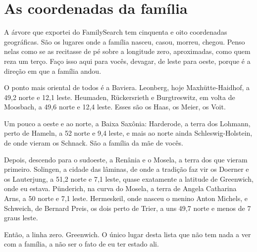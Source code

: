 \documentclass[
  brazilian,
  11pt,
  openany]{book}
\begin{document}
\section{As coordenadas da família}\label{as-coordenadas-da-famuxedlia}

A árvore que exportei do FamilySearch tem cinquenta e oito coordenadas
geográficas. São os lugares onde a família nasceu, casou, morreu,
chegou. Penso nelas como se as recitasse de pé sobre a longitude zero,
aproximadas, como quem reza um terço. Faço isso aqui para vocês,
devagar, de leste para oeste, porque é a direção em que a família andou.

O ponto mais oriental de todos é a Baviera. Leonberg, hoje
Maxhütte-Haidhof, a 49,2 norte e 12,1 leste. Heumaden, Rückersrieth e
Burgtreswitz, em volta de Moosbach, a 49,6 norte e 12,4 leste. Esses são
os Haas, os Meier, os Voit.

Um pouco a oeste e ao norte, a Baixa Saxônia: Harderode, a terra dos
Lohmann, perto de Hameln, a 52 norte e 9,4 leste, e mais ao norte ainda
Schleswig-Holstein, de onde vieram os Schnack. São a família da mãe de
vocês.

Depois, descendo para o sudoeste, a Renânia e o Mosela, a terra dos que
vieram primeiro. Solingen, a cidade das lâminas, de onde a tradição faz
vir os Doerner e os Lauterjung, a 51,2 norte e 7,1 leste, quase
exatamente a latitude de Greenwich, onde eu estava. Pünderich, na curva
do Mosela, a terra de Angela Catharina Arns, a 50 norte e 7,1 leste.
Hermeskeil, onde nasceu o menino Anton Michels, e Schweich, de Bernard
Preis, os dois perto de Trier, a uns 49,7 norte e menos de 7 graus
leste.

Então, a linha zero. Greenwich. O único lugar desta lista que não tem
nada a ver com a família, a não ser o fato de eu ter estado ali.
\end{document}
